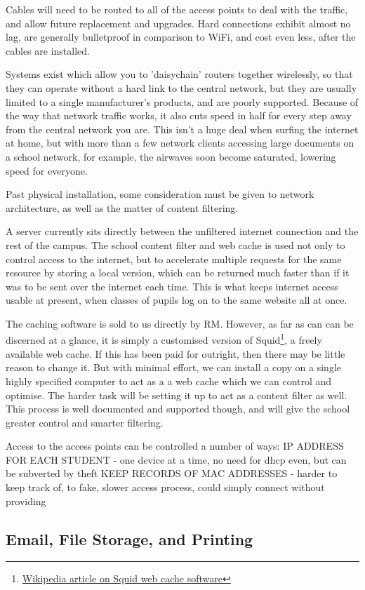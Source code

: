 \documentclass[a4paper,leqno,titlepage]{article}
\begin{document}
Cables will need to be routed to all of the access points to deal with the
traffic, and allow future replacement and upgrades. Hard connections exhibit
almost no lag, are generally bulletproof in comparison to WiFi, and cost even
less, after the cables are installed.


Systems exist which allow you to 'daisychain' routers together wirelessly,
so that they can operate without a hard link to the central network, but they are
usually limited to a single manufacturer's products, and are poorly supported.
Because of the way that network traffic works, it also cuts speed in half for
every step away from the central network you are. This isn't a huge deal when
surfing the internet at home, but with more than a few network clients accessing
large documents on a school network, for example, the airwaves soon become
saturated, lowering speed for everyone.


Past physical installation, some consideration must be given to network
architecture, as well as the matter of content filtering.

A server currently sits directly between the unfiltered internet connection and
the rest of the campus. The school content filter and web cache is used not only
to control access to the internet, but to accelerate multiple requests for the
same resource by storing a local version, which can be returned much faster than
if it was to be sent over the internet each time. This is what keeps internet
access usable at present, when classes of pupils log on to the same website
all at once.

The caching software is sold to us directly by RM. However, as far as can can
be discerned at a glance, it is simply a customised version of
Squid\footnote{\href{http://en.wikipedia.org/wiki/Squid_(software)}{Wikipedia article on Squid web cache software}},
a freely available web cache. If this has been paid for outright, then there
may be little reason to change it. But with minimal effort, we can install a
copy on a single highly specified computer to act as a a web cache which we
can control and optimise. The harder task will be setting it up to act as a
content filter as well. This process is well documented and supported though,
and will give the school greater control and smarter filtering.




Access to the access points can be controlled a number of ways:
IP ADDRESS FOR EACH STUDENT - one device at a time, no need for dhcp even, but can be subverted by theft
KEEP RECORDS OF MAC ADDRESSES - harder to keep track of, to fake, slower access process, could simply connect without providing




\subsection{Email, File Storage, and Printing}


\end{document}
